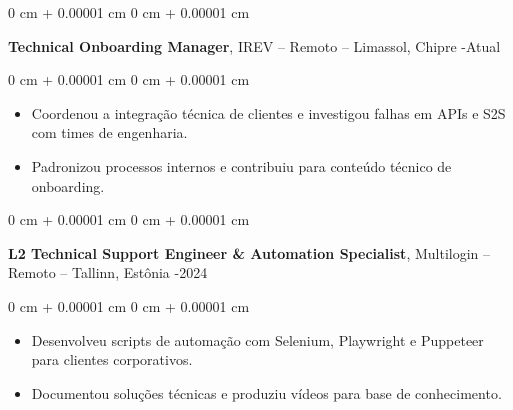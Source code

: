 \documentclass[10pt, letterpaper]{article}
\newenvironment{highlights}{
    \begin{itemize}[
        topsep=0.10 cm,
        parsep=0.10 cm,
        partopsep=0pt,
        itemsep=0pt,
        leftmargin=0 cm + 10pt
    ]
}{
    \end{itemize}
}
\newenvironment{onecolentry}{
    \begin{adjustwidth}{
        0 cm + 0.00001 cm
    }{
        0 cm + 0.00001 cm
    }
}{
    \end{adjustwidth}
}
\begin{document}
\vspace{0.2cm}

    \begin{onecolentry}
        \setcolumnwidth{\fill, 4.5cm}
        \begin{paracol}{2}
            \textbf{Technical Onboarding Manager}, IREV -- Remoto – Limassol, Chipre
            \switchcolumn
            -Atual
        \end{paracol}
    \end{onecolentry}
    \vspace{0.10cm}
    \begin{onecolentry}
        \begin{highlights}
                    \item Coordenou a integração técnica de clientes e investigou falhas em APIs e S2S com times de engenharia.
                \item Padronizou processos internos e contribuiu para conteúdo técnico de onboarding.
        \end{highlights}
    \end{onecolentry}
    
\vspace{0.2cm}

    \begin{onecolentry}
        \setcolumnwidth{\fill, 4.5cm}
        \begin{paracol}{2}
            \textbf{L2 Technical Support Engineer & Automation Specialist}, Multilogin -- Remoto – Tallinn, Estônia
            \switchcolumn
            -2024
        \end{paracol}
    \end{onecolentry}
    \vspace{0.10cm}
    \begin{onecolentry}
        \begin{highlights}
                    \item Desenvolveu scripts de automação com Selenium, Playwright e Puppeteer para clientes corporativos.
                \item Documentou soluções técnicas e produziu vídeos para base de conhecimento.
        \end{highlights}
    \end{onecolentry}
    
\vspace{0.2cm}
\end{document}
